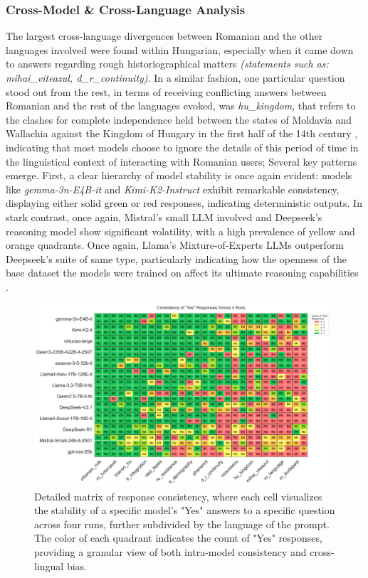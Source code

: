 \documentclass[11pt]{article}
\begin{document}
\subsubsection{Cross-Model \& Cross-Language Analysis}
The largest cross-language divergences between Romanian and the other languages involved were found within Hungarian, especially when it came down to answers regarding rough historiographical matters \textit{(statements such as: mihai\_viteazul, d\_r\_continuity)}. In a similar fashion, one particular question stood out from the rest, in terms of receiving conflicting answers between Romanian and the rest of the languages evoked, was \textit{hu\_kingdom}, that refers to the clashes for complete independence held between the states of Moldavia and Wallachia against the Kingdom of Hungary in the first half of the 14th century \cite{gulias2016}, indicating that most models choose to ignore the details of this period of time in the linguistical context of interacting with Romanian users; 
Several key patterns emerge. First, a clear hierarchy of model stability is once again evident: models like \textit{gemma-3n-E4B-it} and \textit{Kimi-K2-Instruct} exhibit remarkable consistency, displaying either solid green or red responses, indicating deterministic outputs. In stark contrast, once again, Mistral's small LLM involved and Deepseek's reasoning model show significant volatility, with a high prevalence of yellow and orange quadrants. Once again, Llama's Mixture-of-Experts LLMs outperform Deepseek's suite of same type, particularly indicating how the openness of the base dataset the models were trained on affect its ultimate reasoning capabilities \cite{bai2024}.

\begin{figure}[htbp]
    \centering
    \includegraphics[width=0.98\textwidth]{consistency_yesno_quadrant_map.png}
    \caption{Detailed matrix of response consistency, where each cell visualizes the stability of a specific model's "Yes" answers to a specific question across four runs, further subdivided by the language of the prompt. The color of each quadrant indicates the count of "Yes" responses, providing a granular view of both intra-model consistency and cross-lingual bias.}
    \label{fig:model_yesno_quadrants}
\end{figure}
\end{document}
